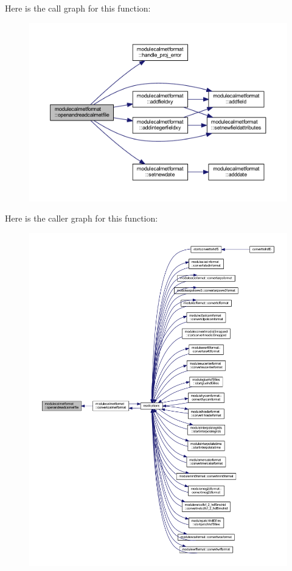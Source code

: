 Here is the call graph for this function\+:\nopagebreak
\begin{figure}[H]
\begin{center}
\leavevmode
\includegraphics[width=350pt]{namespacemodulecalmetformat_a5ff4d55d88eac5ea8ceee14dbc6c26af_cgraph}
\end{center}
\end{figure}
Here is the caller graph for this function\+:\nopagebreak
\begin{figure}[H]
\begin{center}
\leavevmode
\includegraphics[width=350pt]{namespacemodulecalmetformat_a5ff4d55d88eac5ea8ceee14dbc6c26af_icgraph}
\end{center}
\end{figure}
\mbox{\label{namespacemodulecalmetformat_a1c6e763c6740cd630346ca11aab5aa78}} 
